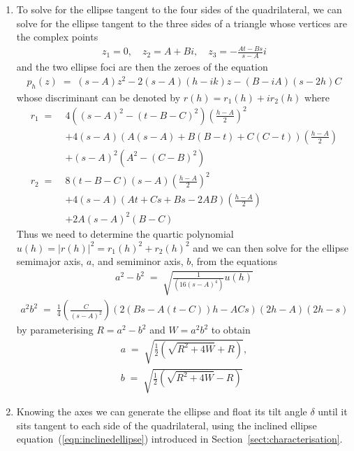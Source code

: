 \documentclass[preprint2]{aastex}
\begin{document}
\begin{enumerate}
\item To solve for the ellipse tangent to the four sides of the quadrilateral, we can solve for the ellipse tangent to the three sides of a triangle whose vertices are the complex points
\begin{eqnarray}
z_{1} = 0, \quad
z_{2} = A+Bi, \quad
z_{3} = -\frac{At-Bs}{s-A}i
\end{eqnarray}
and the two ellipse foci  are then the zeroes of the equation
\begin{eqnarray}
p_{h}(z) \;=\; \left(s-A\right)z^{2}-2\left(s-A\right)\left(h-ik\right)z-\left(B-iA\right)\left(s-2h\right)C
\end{eqnarray}
whose discriminant can be denoted by $r(h)=r_{1}(h)+ir_{2}(h)$ where
\begin{align} \nonumber
r_1 \;=\; &4 \left(\left(s-A\right)^{2}-\left(t-B-C\right)^{2}\right)\left(\frac{h-A}{2}\right)^{2} \\ \nonumber
 &+4 \left(s-A\right)\left(A\left(s-A\right)+B\left(B-t\right)+C\left(C-t\right)\right)\left(\frac{h-A}{2}\right) \\
 &+ \left(s-A\right)^{2}\left(A^{2}-\left(C-B\right)^{2}\right) \\ \nonumber
r_2 \;=\; &8\left(t-B-C\right)\left(s-A\right)\left(\frac{h-A}{2}\right)^{2} \\ \nonumber
&+ 4\left(s-A\right)\left(At+Cs+Bs-2AB\right)\left(\frac{h-A}{2}\right) \\
&+ 2A\left(s-A\right)^{2}\left(B-C\right)
\end{align}
Thus we need to determine the quartic polynomial $u(h)=|r(h)|^{2}={r_1(h)}^{2}+{r_2(h)}^{2}$ and we can then solve for the ellipse semimajor axis, $a$, and semiminor axis, $b$, from the equations
\begin{eqnarray}
a^{2}-b^{2} \;=\; \sqrt{ \frac{1}{\left(16\left(s-A\right)^{4}\right)}u(h)} 
\end{eqnarray}
\begin{eqnarray}
a^{2}b^{2} \;=\; \frac{1}{4}\left(\frac{C}{\left(s-A\right)^{2}}\right)\left(2\left(Bs-A\left(t-C\right)\right)h - ACs\right)\left(2h-A\right)\left(2h-s\right) 
\end{eqnarray}
by parameterising $R=a^{2}-b^{2}$ and $W=a^{2}b^{2}$ to obtain
\begin{eqnarray}
a \;=\; \sqrt{ \frac{1}{2}\left(\sqrt{R^{2}+4W}+R\right)}, \\
b \;=\; \sqrt{ \frac{1}{2}\left(\sqrt{R^{2}+4W}-R\right)}
\end{eqnarray}
\item Knowing the axes we can generate the ellipse and float its tilt angle $\delta$ until it sits tangent to each side of the quadrilateral, using the inclined ellipse equation~(\ref{eqn:inclinedellipse}) introduced in Section~\ref{sect:characterisation}.
\end{enumerate}
\noindent
\end{document}

